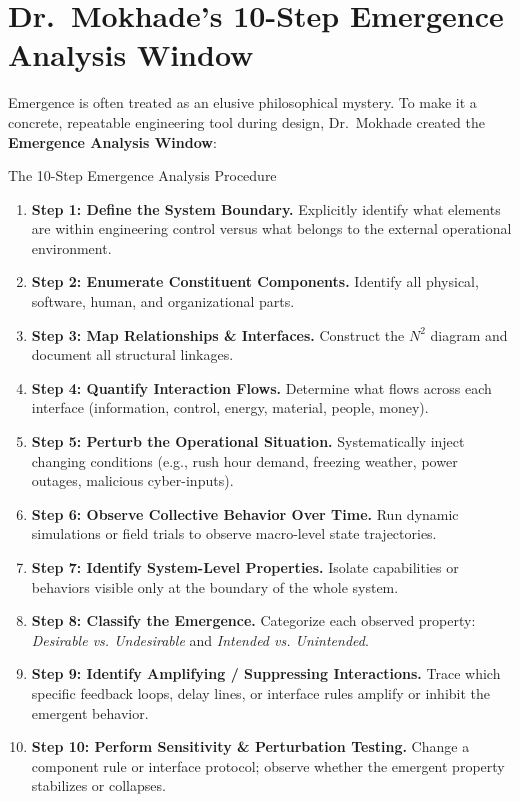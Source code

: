 \section{Dr.~Mokhade's 10-Step Emergence Analysis Window}
\label{sec:ten_step_emergence}

Emergence is often treated as an elusive philosophical mystery. To make it a concrete, repeatable engineering tool during design, Dr.~Mokhade created the \textbf{Emergence Analysis Window}:

\begin{checklistbox}{The 10-Step Emergence Analysis Procedure}
\begin{enumerate}[leftmargin=2em, itemsep=3pt]
    \item \textbf{Step 1: Define the System Boundary.} Explicitly identify what elements are within engineering control versus what belongs to the external operational environment.
    \item \textbf{Step 2: Enumerate Constituent Components.} Identify all physical, software, human, and organizational parts.
    \item \textbf{Step 3: Map Relationships \& Interfaces.} Construct the $N^2$ diagram and document all structural linkages.
    \item \textbf{Step 4: Quantify Interaction Flows.} Determine what flows across each interface (information, control, energy, material, people, money).
    \item \textbf{Step 5: Perturb the Operational Situation.} Systematically inject changing conditions (e.g., rush hour demand, freezing weather, power outages, malicious cyber-inputs).
    \item \textbf{Step 6: Observe Collective Behavior Over Time.} Run dynamic simulations or field trials to observe macro-level state trajectories.
    \item \textbf{Step 7: Identify System-Level Properties.} Isolate capabilities or behaviors visible only at the boundary of the whole system.
    \item \textbf{Step 8: Classify the Emergence.} Categorize each observed property: \textit{Desirable vs. Undesirable} and \textit{Intended vs. Unintended}.
    \item \textbf{Step 9: Identify Amplifying / Suppressing Interactions.} Trace which specific feedback loops, delay lines, or interface rules amplify or inhibit the emergent behavior.
    \item \textbf{Step 10: Perform Sensitivity \& Perturbation Testing.} Change a component rule or interface protocol; observe whether the emergent property stabilizes or collapses.
\end{enumerate}
\end{checklistbox}

